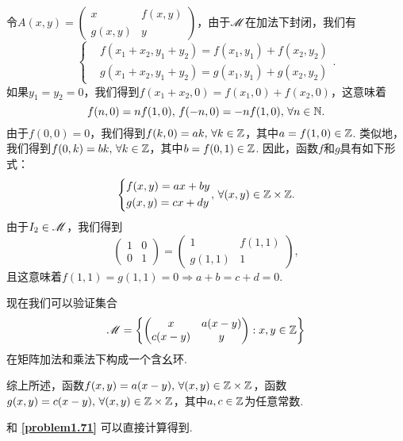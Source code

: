 \begin{solution}
  令$A(x,y)=\begin{pmatrix}
    x & f(x,y) \\
    g(x,y) & y
  \end{pmatrix}$，由于$\mathscr M$在加法下封闭，我们有
  \[
    \left\{
      \begin{aligned}
        & f(x_1 + x_2, y_1 + y_2) = f(x_1,y_1) + f(x_2,y_2) \\
        & g(x_1 + x_2, y_1 + y_2) = g(x_1,y_1) + g(x_2,y_2)
      \end{aligned}
    \right..
  \]
  如果$y_1=y_2=0$，我们得到$f(x_1+x_2,0)=f(x_1,0)+f(x_2,0)$，这意味着
  \[
    f(n,0) = nf(1,0),\, f(-n,0) = -nf(1,0),\,\forall n\in \mathbb N.
  \]
  由于$f(0,0)=0$，我们得到$f(k,0)=ak,\,\forall k\in\mathbb Z$，其中$a=f(1,0)\in\mathbb Z$. 类似地，我们得到$f(0,k)=bk,\,\forall k\in\mathbb Z$，其中$b=f(0,1)\in\mathbb Z$. 因此，函数$f$和$g$具有如下形式：
  \[
    \left\{
      \begin{aligned}
        & f(x,y) = ax + by \\
        & g(x,y) = cx + dy
      \end{aligned}
    \right.,\,\forall (x,y)\in\MZ \times \MZ.
  \]
  由于$I_2\in\mathscr M$，我们得到
  \[
    \begin{pmatrix}
      1 & 0 \\
      0 & 1
    \end{pmatrix} = \begin{pmatrix}
      1 & f(1,1) \\
      g(1,1) & 1
    \end{pmatrix},
  \]
  且这意味着$f(1,1)=g(1,1)=0\Rightarrow a+b=c+d=0$.

  现在我们可以验证集合
  \[
    \MM = \left\{
      \begin{pmatrix}
        x & a(x - y) \\
        c(x - y ) & y
      \end{pmatrix}:x,y\in\MZ
    \right\}
  \]
  在矩阵加法和乘法下构成一个含幺环.

  综上所述，函数$f(x,y)=a(x-y),\,\forall (x,y)\in\mathbb Z\times\mathbb Z$，函数$g(x,y)=c(x-y),\,\forall (x,y)\in\mathbb Z\times\mathbb Z$，其中$a,c\in\mathbb Z$为任意常数.
\end{solution}

\begin{solution}
  和 \textbf{\ref{problem1.71}}\hspace*{0.5em} 可以直接计算得到.
\end{solution}

\setcounter{solution}{71}

